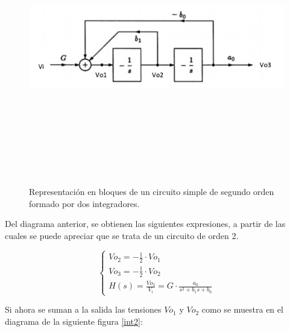 \begin{figure}[H] %
	\centering
	\includegraphics[width=12cm,height=12cm,keepaspectratio]{../EJ4/imagenes/int1.png}
	\caption{Representaci\'on en bloques de un circuito simple de segundo orden formado por dos integradores.}
	\label{int1}
\end{figure}

Del diagrama anterior, se obtienen las siguientes expresiones, a partir de las cuales se puede apreciar que se trata de un circuito de orden 2.

\begin{equation}
\begin{cases}
	Vo_2 = -\frac{1}{2} \cdot Vo_1\\
	Vo_3 = -\frac{1}{2} \cdot Vo_2\\
	H(s) = \frac{Vo_3}{V_i} = G \cdot \frac{a_0}{s^2 + b_1 s + b_0}
	\label{int2eq}
\end{cases}
\end{equation}

Si ahora se suman a la salida las tensiones $Vo_1$ y $Vo_2$ como se muestra en el diagrama de la siguiente figura \ref{int2}:

